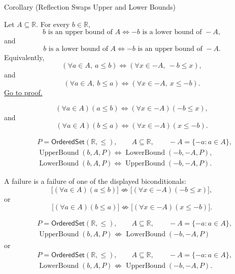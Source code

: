 \begin{corollarybox}{Corollary (Reflection Swaps Upper and Lower Bounds)}
\begin{corollary}
\label{cor:reflection-swaps-upper-lower-bounds}
Let $A\subseteq\mathbb{R}$. For every $b\in\mathbb{R}$,
\[
b\text{ is an upper bound of }A
\Longleftrightarrow
-b\text{ is a lower bound of }-A,
\]
and
\[
b\text{ is a lower bound of }A
\Longleftrightarrow
-b\text{ is an upper bound of }-A.
\]
Equivalently,
\[
\left(\forall a\in A,\ a\leq b\right)
\Longleftrightarrow
\left(\forall x\in -A,\ -b\leq x\right),
\]
and
\[
\left(\forall a\in A,\ b\leq a\right)
\Longleftrightarrow
\left(\forall x\in -A,\ x\leq -b\right).
\]
\hyperref[prf:reflection-swaps-upper-lower-bounds]{Go to proof.}
\end{corollary}
\end{corollarybox}

\begin{remark*}
\[
(\forall a\in A)(a\leq b)\Longleftrightarrow
(\forall x\in -A)(-b\leq x),
\]
and
\[
(\forall a\in A)(b\leq a)\Longleftrightarrow
(\forall x\in -A)(x\leq -b).
\]
\end{remark*}

\begin{remark*}
\[
\begin{aligned}
&P=\mathsf{OrderedSet}(\mathbb{R},\leq),\qquad
A\subseteq\mathbb{R},\qquad -A=\{-a:a\in A\},\\
&\operatorname{UpperBound}(b,A,P)\Longleftrightarrow\operatorname{LowerBound}(-b,-A,P),\\
&\operatorname{LowerBound}(b,A,P)\Longleftrightarrow\operatorname{UpperBound}(-b,-A,P).
\end{aligned}
\]
\end{remark*}

\begin{remark*}
A failure is a failure of one of the displayed biconditionals:
\[
\bigl[(\forall a\in A)(a\leq b)\bigr]
\not\Longleftrightarrow
\bigl[(\forall x\in -A)(-b\leq x)\bigr],
\]
or
\[
\bigl[(\forall a\in A)(b\leq a)\bigr]
\not\Longleftrightarrow
\bigl[(\forall x\in -A)(x\leq -b)\bigr].
\]
\end{remark*}

\begin{remark*}
\[
\begin{aligned}
&P=\mathsf{OrderedSet}(\mathbb{R},\leq),\qquad
A\subseteq\mathbb{R},\qquad -A=\{-a:a\in A\},\\
&\operatorname{UpperBound}(b,A,P)\not\Longleftrightarrow\operatorname{LowerBound}(-b,-A,P)
\end{aligned}
\]
or
\[
\begin{aligned}
&P=\mathsf{OrderedSet}(\mathbb{R},\leq),\qquad
A\subseteq\mathbb{R},\qquad -A=\{-a:a\in A\},\\
&\operatorname{LowerBound}(b,A,P)\not\Longleftrightarrow\operatorname{UpperBound}(-b,-A,P).
\end{aligned}
\]
\end{remark*}

